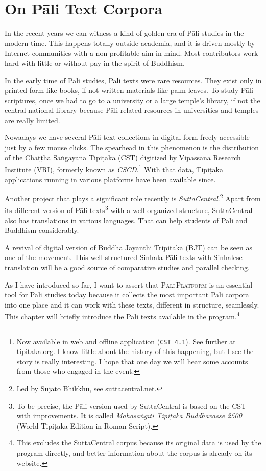 \chapter{On Pāli Text Corpora}

In the recent years we can witness a kind of golden era of Pāli studies in the modern time. This happens totally outside academia, and it is driven mostly by Internet communities with a non-profitable aim in mind. Most contributors work hard with little or without pay in the spirit of Buddhism.

In the early time of Pāli studies, Pāli texts were rare resources. They exist only in printed form like books, if not written materials like palm leaves. To study Pāli scriptures, once we had to go to a university or a large temple's library, if not the central national library because Pāli related resources in universities and temples are really limited. 

Nowadays we have several Pāli text collections in digital form freely accessible just by a few mouse clicks. The spearhead in this phenomenon is the distribution of the Chaṭṭha Saṅgāyana Tipiṭaka (CST) digitized by Vipassana Research Institute (VRI), formerly known as \emph{CSCD}.\footnote{Now available in web and offline application (\texttt{CST\,4.1}). See further at \url{tipitaka.org}. I know little about the history of this happening, but I see the story is really interesting. I hope that one day we will hear some accounts from those who engaged in the event.} With that data, Tipiṭaka applications running in various platforms have been available since.

Another project that plays a significant role recently is \emph{SuttaCentral}.\footnote{Led by Sujato Bhikkhu, see \url{suttacentral.net}.} Apart from its different version of Pāli texts\footnote{To be precise, the Pāli version used by SuttaCentral is based on the CST with improvements. It is called \emph{Mahāsaṅgīti Tipiṭaka Buddhavasse 2500} (World Tipiṭaka Edition in Roman Script).} with a well-organized structure, SuttaCentral also has translations in various languages. That can help students of Pāli and Buddhism considerably. 

A revival of digital version of Buddha Jayanthi Tripitaka (BJT) can be seen as one of the movement. This well-structured Sinhala Pāli texts with Sinhalese translation will be a good source of comparative studies and parallel checking.

As I have introduced so far, I want to assert that \textsc{Pāli\,Platform} is an essential tool for Pāli studies today because it collects the most important Pāli corpora into one place and it can work with these texts, different in structure, seamlessly. This chapter will briefly introduce the Pāli texts available in the program.\footnote{This excludes the SuttaCentral corpus because its original data is used by the program directly, and better information about the corpus is already on its website.}

